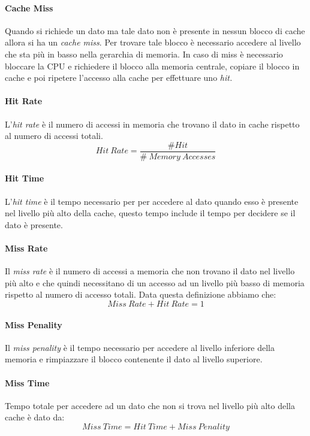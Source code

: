 \paragraph{Cache Miss}
Quando si richiede un dato ma tale dato non è presente in nessun blocco di cache allora si ha un \emph{cache miss}. Per trovare tale blocco è necessario accedere al livello che sta più in basso nella gerarchia di memoria. In caso di miss è necessario bloccare la CPU e richiedere il blocco alla memoria centrale, copiare il blocco in cache e poi ripetere l'accesso alla cache per effettuare uno \emph{hit.}
\paragraph{Hit Rate}
L'\emph{hit rate} è il numero di accessi in memoria che trovano il dato in cache rispetto al numero di accessi totali.
$$Hit \ Rate = \frac{ \# Hit}{\# \ Memory \ Accesses}$$
\paragraph{Hit Time}
L'\emph{hit time} è il tempo necessario per per accedere al dato quando esso è presente nel livello più alto della cache, questo tempo include il tempo per decidere se il dato è presente.
\paragraph{Miss Rate}
Il \emph{miss rate} è il numero di accessi a memoria che non trovano il dato nel livello più alto e che quindi necessitano di un accesso ad un livello più basso di memoria rispetto al numero di accesso totali. Data questa definizione abbiamo che:
$$Miss \ Rate + Hit \ Rate = 1$$
\paragraph{Miss Penality}
Il \emph{miss penality} è il tempo necessario per accedere al livello inferiore della memoria e rimpiazzare il blocco contenente il dato al livello superiore.
\paragraph{Miss Time}
Tempo totale per accedere ad un dato che non si trova nel livello più alto della cache è dato da:
$$Miss \ Time = Hit \ Time + Miss \ Penality$$
